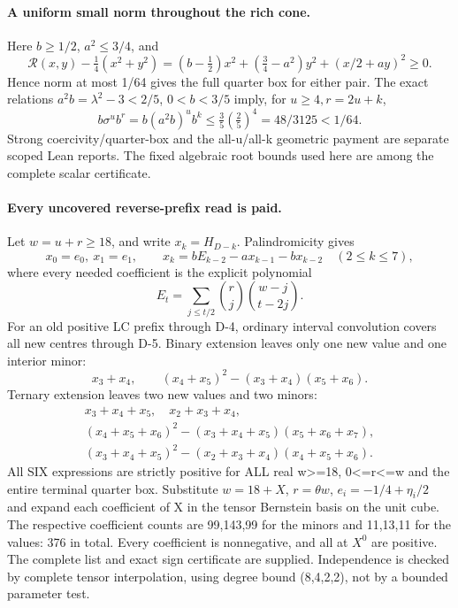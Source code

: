 \paragraph{A uniform small norm throughout the rich cone.}
Here $b\ge1/2$, $a^2\le3/4$, and
\[
 \mathcal R(x,y)-\tfrac14(x^2+y^2)
       =(b-\tfrac12)x^2+(\tfrac34-a^2)y^2+(x/2+ay)^2\ge0.
\]
Hence norm at most 1/64 gives the full quarter box for either pair.
The exact relations $a^2b=\lambda^2-3<2/5$, $0<b<3/5$ imply,
for $u\ge4,r=2u+k$,
\[
 b\sigma^u b^r=b(a^2b)^u b^k
              \le\tfrac35(\tfrac25)^4
                    =48/3125<1/64.                       \tag{4}
\]
Strong coercivity/quarter-box and the all-u/all-k geometric payment
are separate scoped Lean reports. The fixed algebraic root bounds
used here are among the complete scalar certificate.

\paragraph{Every uncovered reverse-prefix read is paid.}
Let $w=u+r\ge18$, and write $x_k=H_{D-k}$. Palindromicity gives
\[
 x_0=e_0,\ x_1=e_1,\qquad
 x_k=bE_{k-2}-ax_{k-1}-bx_{k-2}\quad(2\le k\le7),          \tag{5}
\]
where every needed coefficient is the explicit polynomial
\[
               E_t=\sum_{j\le t/2}{r\choose j}{w-j\choose t-2j}.
\]
For an old positive LC prefix through D-4, ordinary interval
convolution covers all new centres through D-5. Binary extension
leaves only one new value and one interior minor:
\[
 x_3+x_4,\qquad (x_4+x_5)^2-(x_3+x_4)(x_5+x_6).
\]
Ternary extension leaves two new values and two minors:
\[
\begin{gathered}
 x_3+x_4+x_5,\quad x_2+x_3+x_4,\\
 (x_4+x_5+x_6)^2-(x_3+x_4+x_5)(x_5+x_6+x_7),\\
 (x_3+x_4+x_5)^2-(x_2+x_3+x_4)(x_4+x_5+x_6).
\end{gathered}
\]
All SIX expressions are strictly positive for ALL real w>=18,
0<=r<=w and the entire terminal quarter box. Substitute
$w=18+X$, $r=\theta w$, $e_i=-1/4+\eta_i/2$ and expand each
coefficient of X in the tensor Bernstein basis on the unit cube.
The respective coefficient counts are 99,143,99 for the minors and
11,13,11 for the values: 376 in total. Every coefficient is
nonnegative, and all at $X^0$ are positive. The complete list and
exact sign certificate are supplied. Independence is checked by
complete tensor interpolation, using degree bound (8,4,2,2), not
by a bounded parameter test.

